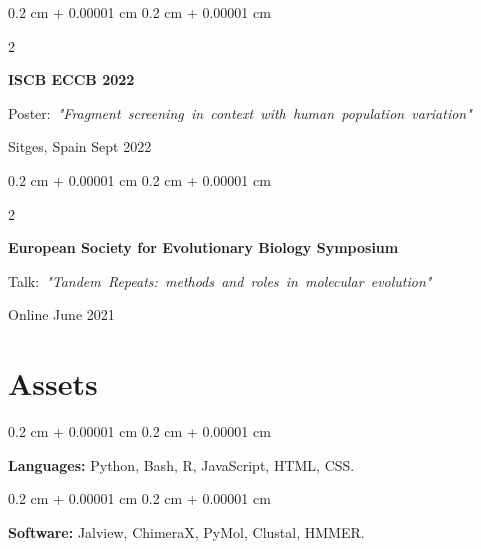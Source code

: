 \documentclass[10pt, letterpaper]{article}
\newenvironment{onecolentry}{
    \begin{adjustwidth}{
        0.2 cm + 0.00001 cm
    }{
        0.2 cm + 0.00001 cm
    }
}{
    \end{adjustwidth}
} %
\newenvironment{twocolentry}[2][]{
    \onecolentry
    \def\secondColumn{#2}
    \setcolumnwidth{\fill, 4.5 cm}
    \begin{paracol}{2}
}{
    \switchcolumn \raggedleft \secondColumn
    \end{paracol}
    \endonecolentry
} %
\begin{document}
        \vspace{0.2 cm}

        \begin{samepage}
            \begin{twocolentry}{
                Sept 2022
            }
                \textbf{ISCB ECCB 2022}

                \vspace{0.10 cm}

                \mbox{Poster: \textit{"Fragment screening in context with human population variation"}}
                \vspace{0.10 cm}

        Sitges, Spain    \end{twocolentry}
        \end{samepage}

        \vspace{0.2 cm}

        \begin{samepage}
            \begin{twocolentry}{
                June 2021
            }
                \textbf{European Society for Evolutionary Biology Symposium}

                \vspace{0.10 cm}

                \mbox{Talk: \textit{"Tandem Repeats: methods and roles in molecular evolution"}}
                \vspace{0.10 cm}

        Online    \end{twocolentry}
        \end{samepage}


    
    \section{Assets}



        
        \begin{onecolentry}
            \textbf{Languages:} Python, Bash, R, JavaScript, HTML, CSS.
        \end{onecolentry}

        \vspace{0.2 cm}

        \begin{onecolentry}
            \textbf{Software:} Jalview, ChimeraX, PyMol, Clustal, HMMER.
        \end{onecolentry}
\end{document}
